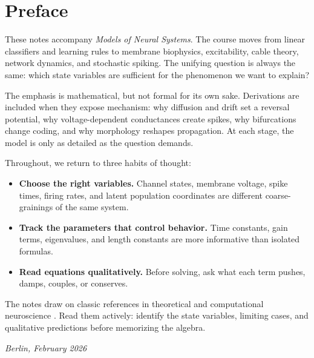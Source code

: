 \chapter*{Preface}

These notes accompany \emph{Models of Neural Systems}. The course moves from linear classifiers and learning rules to membrane biophysics, excitability, cable theory, network dynamics, and stochastic spiking. The unifying question is always the same: which state variables are sufficient for the phenomenon we want to explain?

The emphasis is mathematical, but not formal for its own sake. Derivations are included when they expose mechanism: why diffusion and drift set a reversal potential, why voltage-dependent conductances create spikes, why bifurcations change coding, and why morphology reshapes propagation. At each stage, the model is only as detailed as the question demands.

Throughout, we return to three habits of thought:
\begin{itemize}
  \item \textbf{Choose the right variables.} Channel states, membrane voltage, spike times, firing rates, and latent population coordinates are different coarse-grainings of the same system.
  \item \textbf{Track the parameters that control behavior.} Time constants, gain terms, eigenvalues, and length constants are more informative than isolated formulas.
  \item \textbf{Read equations qualitatively.} Before solving, ask what each term pushes, damps, couples, or conserves.
\end{itemize}

The notes draw on classic references in theoretical and computational neuroscience \parencite{dayan2001theoretical,gerstner2014neuronal,koch1999biophysics,izhikevich2007dynamical,hodgkin1952quantitative}. Read them actively: identify the state variables, limiting cases, and qualitative predictions before memorizing the algebra.

\bigskip
\noindent\textit{Berlin, February 2026}
